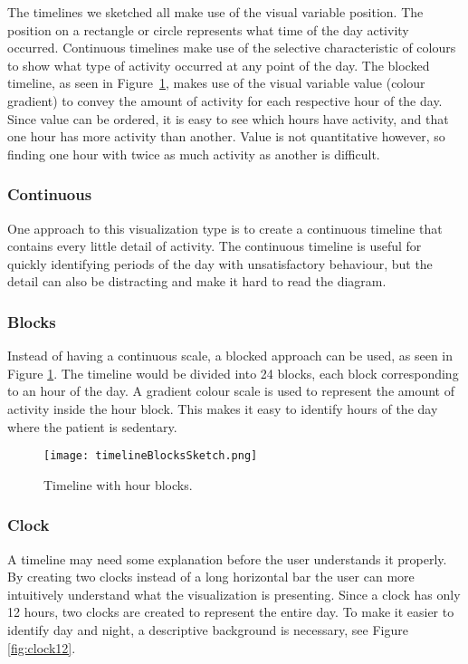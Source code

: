 The timelines we sketched all make use of the visual variable position. The position on a rectangle or circle represents what time of the day activity occurred. Continuous timelines make use of the selective characteristic of colours to show what type of activity occurred at any point of the day. The blocked timeline, as seen in Figure~\ref{fig:timelineBlocks}, makes use of the visual variable value (colour gradient) to convey the amount of activity for each respective hour of the day. Since value can be ordered, it is easy to see which hours have activity, and that one hour has more activity than another. Value is not quantitative however, so finding one hour with twice as much activity as another is difficult.

\subsubsection{Continuous}
One approach to this visualization type is to create a continuous timeline that contains every little detail of activity. The continuous timeline is useful for quickly identifying periods of the day with unsatisfactory behaviour, but the detail can also be distracting and make it hard to read the diagram.

\subsubsection{Blocks}
Instead of having a continuous scale, a blocked approach can be used, as seen in Figure \ref{fig:timelineBlocks}. The timeline would be divided into 24 blocks, each block corresponding to an hour of the day. A gradient colour scale is used to represent the amount of activity inside the hour block. This makes it easy to identify hours of the day where the patient is sedentary. 

\begin{figure}[h!]
	\centering
		\texttt{[image: timelineBlocksSketch.png]}
		\caption[T2 sketch]{Timeline with hour blocks.}
		\label{fig:timelineBlocks}
\end{figure}

\subsubsection{Clock}
A timeline may need some explanation before the user understands it properly. By creating two clocks instead of a long horizontal bar the user can more intuitively understand what the visualization is presenting. Since a clock has only 12 hours, two clocks are created to represent the entire day. To make it easier to identify day and night, a descriptive background is necessary, see Figure \ref{fig:clock12}.

